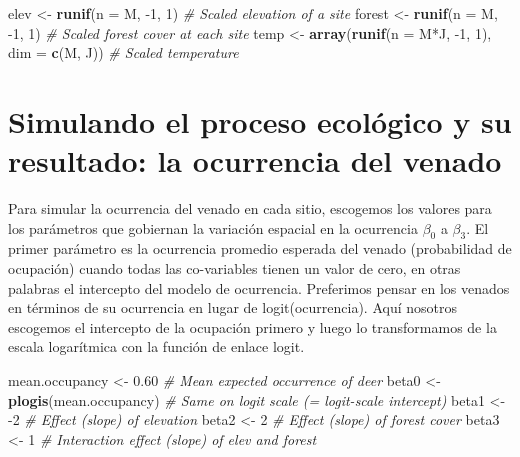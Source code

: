 \documentclass[]{book}
\newenvironment{Shaded}{\begin{snugshade}}{\end{snugshade}}
\newcommand{\KeywordTok}[1]{\textcolor[rgb]{0.13,0.29,0.53}{\textbf{{#1}}}}
\newcommand{\DataTypeTok}[1]{\textcolor[rgb]{0.13,0.29,0.53}{{#1}}}
\newcommand{\DecValTok}[1]{\textcolor[rgb]{0.00,0.00,0.81}{{#1}}}
\newcommand{\FloatTok}[1]{\textcolor[rgb]{0.00,0.00,0.81}{{#1}}}
\newcommand{\StringTok}[1]{\textcolor[rgb]{0.31,0.60,0.02}{{#1}}}
\newcommand{\CommentTok}[1]{\textcolor[rgb]{0.56,0.35,0.01}{\textit{{#1}}}}
\newcommand{\NormalTok}[1]{{#1}}
\begin{document}
\begin{Shaded}
\begin{Highlighting}[]
\NormalTok{elev <-}\StringTok{ }\KeywordTok{runif}\NormalTok{(}\DataTypeTok{n =} \NormalTok{M, -}\DecValTok{1}\NormalTok{, }\DecValTok{1}\NormalTok{)             }\CommentTok{# Scaled elevation of a site}
\NormalTok{forest <-}\StringTok{ }\KeywordTok{runif}\NormalTok{(}\DataTypeTok{n =} \NormalTok{M, -}\DecValTok{1}\NormalTok{, }\DecValTok{1}\NormalTok{)           }\CommentTok{# Scaled forest cover at each site}
\NormalTok{temp <-}\StringTok{ }\KeywordTok{array}\NormalTok{(}\KeywordTok{runif}\NormalTok{(}\DataTypeTok{n =} \NormalTok{M*J, -}\DecValTok{1}\NormalTok{, }\DecValTok{1}\NormalTok{), }\DataTypeTok{dim =} \KeywordTok{c}\NormalTok{(M, J)) }\CommentTok{# Scaled temperature}
\end{Highlighting}
\end{Shaded}

\section{Simulando el proceso ecológico y su resultado: la ocurrencia
del
venado}\label{simulando-el-proceso-ecologico-y-su-resultado-la-ocurrencia-del-venado}

Para simular la ocurrencia del venado en cada sitio, escogemos los
valores para los parámetros que gobiernan la variación espacial en la
ocurrencia \(\beta _{0}\) a \(\beta _{3}\). El primer parámetro es la
ocurrencia promedio esperada del venado (probabilidad de ocupación)
cuando todas las co-variables tienen un valor de cero, en otras palabras
el intercepto del modelo de ocurrencia. Preferimos pensar en los venados
en términos de su ocurrencia en lugar de logit(ocurrencia). Aquí
nosotros escogemos el intercepto de la ocupación primero y luego lo
transformamos de la escala logarítmica con la función de enlace logit.

\begin{Shaded}
\begin{Highlighting}[]
\NormalTok{mean.occupancy <-}\StringTok{ }\FloatTok{0.60}         \CommentTok{# Mean expected occurrence of deer}
\NormalTok{beta0 <-}\StringTok{ }\KeywordTok{plogis}\NormalTok{(mean.occupancy) }\CommentTok{# Same on logit scale (= logit-scale intercept)}
\NormalTok{beta1 <-}\StringTok{ }\NormalTok{-}\DecValTok{2}                    \CommentTok{# Effect (slope) of elevation}
\NormalTok{beta2 <-}\StringTok{ }\DecValTok{2}                     \CommentTok{# Effect (slope) of forest cover}
\NormalTok{beta3 <-}\StringTok{ }\DecValTok{1}                     \CommentTok{# Interaction effect (slope) of elev and forest}
\end{Highlighting}
\end{Shaded}
\end{document}
